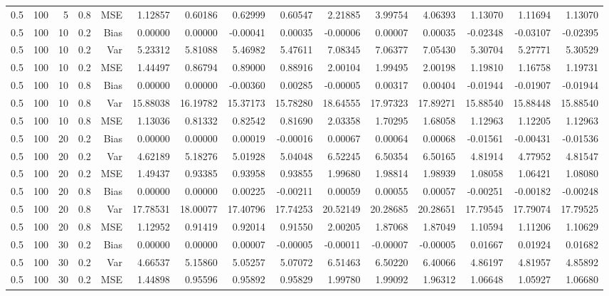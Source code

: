 \begin{table}[!htbp]
\begin{tabular}{lrrrrrrrrrrrrrr}
0.5 & 100 &  5 & 0.8 & MSE & 1.12857 & 0.60186 & 0.62999 & 0.60547 & 2.21885 & 3.99754 & 4.06393 & 1.13070 & 1.11694 & 1.13070 \\
0.5 & 100 & 10 & 0.2 & Bias & 0.00000 & 0.00000 & -0.00041 & 0.00035 & -0.00006 & 0.00007 & 0.00035 & -0.02348 & -0.03107 & -0.02395 \\
0.5 & 100 & 10 & 0.2 & Var & 5.23312 & 5.81088 & 5.46982 & 5.47611 & 7.08345 & 7.06377 & 7.05430 & 5.30704 & 5.27771 & 5.30529 \\
0.5 & 100 & 10 & 0.2 & MSE & 1.44497 & 0.86794 & 0.89000 & 0.88916 & 2.00104 & 1.99495 & 2.00198 & 1.19810 & 1.16758 & 1.19731 \\
0.5 & 100 & 10 & 0.8 & Bias & 0.00000 & 0.00000 & -0.00360 & 0.00285 & -0.00005 & 0.00317 & 0.00404 & -0.01944 & -0.01907 & -0.01944 \\
0.5 & 100 & 10 & 0.8 & Var & 15.88038 & 16.19782 & 15.37173 & 15.78280 & 18.64555 & 17.97323 & 17.89271 & 15.88540 & 15.88448 & 15.88540 \\
0.5 & 100 & 10 & 0.8 & MSE & 1.13036 & 0.81332 & 0.82542 & 0.81690 & 2.03358 & 1.70295 & 1.68058 & 1.12963 & 1.12205 & 1.12963 \\
0.5 & 100 & 20 & 0.2 & Bias & 0.00000 & 0.00000 & 0.00019 & -0.00016 & 0.00067 & 0.00064 & 0.00068 & -0.01561 & -0.00431 & -0.01536 \\
0.5 & 100 & 20 & 0.2 & Var & 4.62189 & 5.18276 & 5.01928 & 5.04048 & 6.52245 & 6.50354 & 6.50165 & 4.81914 & 4.77952 & 4.81547 \\
0.5 & 100 & 20 & 0.2 & MSE & 1.49437 & 0.93385 & 0.93958 & 0.93855 & 1.99680 & 1.98814 & 1.98939 & 1.08058 & 1.06421 & 1.08080 \\
0.5 & 100 & 20 & 0.8 & Bias & 0.00000 & 0.00000 & 0.00225 & -0.00211 & 0.00059 & 0.00055 & 0.00057 & -0.00251 & -0.00182 & -0.00248 \\
0.5 & 100 & 20 & 0.8 & Var & 17.78531 & 18.00077 & 17.40796 & 17.74253 & 20.52149 & 20.28685 & 20.28651 & 17.79545 & 17.79074 & 17.79525 \\
0.5 & 100 & 20 & 0.8 & MSE & 1.12952 & 0.91419 & 0.92014 & 0.91550 & 2.00205 & 1.87068 & 1.87049 & 1.10594 & 1.11206 & 1.10629 \\
0.5 & 100 & 30 & 0.2 & Bias & 0.00000 & 0.00000 & 0.00007 & -0.00005 & -0.00011 & -0.00007 & -0.00005 & 0.01667 & 0.01924 & 0.01682 \\
0.5 & 100 & 30 & 0.2 & Var & 4.66537 & 5.15860 & 5.05257 & 5.07072 & 6.51463 & 6.50220 & 6.40066 & 4.86197 & 4.81957 & 4.85892 \\
0.5 & 100 & 30 & 0.2 & MSE & 1.44898 & 0.95596 & 0.95892 & 0.95829 & 1.99780 & 1.99092 & 1.96312 & 1.06648 & 1.05927 & 1.06680 \\

\end{tabular}
\end{table}
